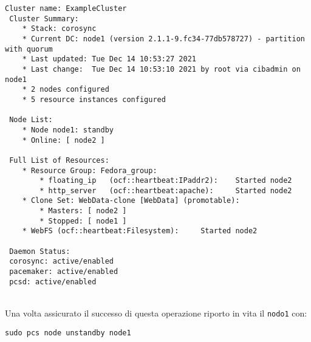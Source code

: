 \begin{lstlisting}[style=output]
 Cluster name: ExampleCluster
 Cluster Summary:
    * Stack: corosync
    * Current DC: node1 (version 2.1.1-9.fc34-77db578727) - partition with quorum
    * Last updated: Tue Dec 14 10:53:27 2021
    * Last change:  Tue Dec 14 10:53:10 2021 by root via cibadmin on node1
    * 2 nodes configured
    * 5 resource instances configured

 Node List:
    * Node node1: standby
    * Online: [ node2 ]

 Full List of Resources:
    * Resource Group: Fedora_group:
        * floating_ip	(ocf::heartbeat:IPaddr2):	 Started node2
        * http_server	(ocf::heartbeat:apache):	 Started node2
    * Clone Set: WebData-clone [WebData] (promotable):
        * Masters: [ node2 ]
        * Stopped: [ node1 ]
    * WebFS	(ocf::heartbeat:Filesystem):	 Started node2

 Daemon Status:
 corosync: active/enabled
 pacemaker: active/enabled
 pcsd: active/enabled
\end{lstlisting}
\ \\
Una volta assicurato il successo di questa operazione riporto in vita il \lstinline[style=cmd]|nodo1| con:

\begin{lstlisting}[style=cmd]
 sudo pcs node unstandby node1
\end{lstlisting}